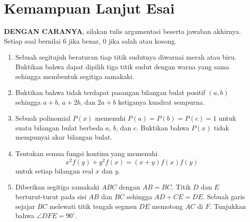 \documentclass[11pt]{scrartcl}
\begin{document}
\section{Kemampuan Lanjut Esai}
\textbf{DENGAN CARANYA}, silakan tulis argumentasi beserta jawaban akhirnya. Setiap soal bernilai 6 jika benar, 0 jika salah atau kosong.
\begin{enumerate}[resume]
    \item Sebuah segitujuh beraturan tiap titik sudutnya diwarnai merah atau biru. Buktikan bahwa dapat dipilih tiga titik sudut dengan warna yang sama sehingga membentuk segitiga samakaki.
    \item Buktikan bahwa tidak terdapat pasangan bilangan bulat positif $(a, b)$ sehingga $a + b$, $a + 2b$, dan $2a + b$ ketiganya kuadrat sempurna.
    \item Sebuah polinomial $P(x)$ memenuhi $P(a) = P(b) = P(c) = 1$ untuk suatu bilangan bulat berbeda $a$, $b$, dan $c$. Buktikan bahwa $P(x)$ tidak mempunyai akar bilangan bulat.
    \item Tentukan semua fungsi kontinu yang memenuhi
        $$x^2f(y) + y^2f(x) = (x + y)f(x)f(y)$$
        untuk setiap bilangan real $x$ dan $y$.
    \item Diberikan segitiga samakaki $ABC$ dengan $AB = BC$. Titik $D$ dan $E$ berturut-turut pada sisi $AB$ dan $BC$ sehingga $AD + CE = DE$. Sebuah garis sejajar $BC$ melewati titik tengah segmen $DE$ memotong $AC$ di $F$. Tunjukkan bahwa $\angle DFE = 90^\circ$.
\end{enumerate}
\end{document}
